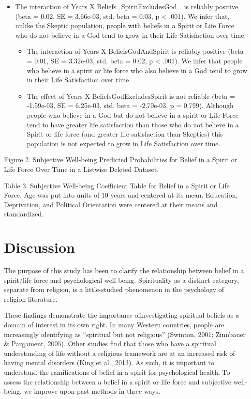 \documentclass[
  english,
  man]{apa6}
\providecommand{\tightlist}{%
  \setlength{\itemsep}{0pt}\setlength{\parskip}{0pt}}
\begin{document}
\begin{itemize}
\tightlist
\item
  The interaction of Years X Beliefs\_SpiritExcludesGod\_ is reliably positive (beta = 0.02, SE = 3.66e-03, std. beta = 0.03, p \textless{} .001). We infer that, unlike the Skeptic population, people with beliefs in a Spirit or Life Force who do not believe in a God tend to grow in their Life Satisfaction over time.

  \begin{itemize}
  \tightlist
  \item
    The interaction of Years X BeliefsGodAndSpirit is reliably positive (beta = 0.01, SE = 3.32e-03, std. beta = 0.02, p \textless{} .001). We infer that people who believe in a spirit or life force who also believe in a God tend to grow in their Life Satisfaction over time
  \item
    The effect of Years X BeliefsGodExcludesSpirit is not reliable (beta = -1.59e-03, SE = 6.25e-03, std. beta = -2.70e-03, p = 0.799). Although people who believe in a God but do not believe in a spirit or Life Force tend to have greater life satisfaction than those who do not believe in a Spirit or life force (and greater life satisfaction than Skeptics) this population is not expected to grow in Life Satisfaction over time.
  \end{itemize}
\end{itemize}

Figure 2. Subjective Well-being Predicted Probabilities for Belief in a Spirit or Life Force Over Time in a Listwise Deleted Dataset.

Table 3. Subjective Well-being Coefficient Table for Belief in a Spirit or Life Force. Age was put into units of 10 years and centered at its mean. Education, Deprivation, and Political Orientation were centered at their means and standardized.

\hypertarget{discussion}{%
\section{Discussion}\label{discussion}}

The purpose of this study has been to clarify the relationship between belief in a spirit/life force and psychological well-being. Spirituality as a distinct category, separate from religion, is a little-studied phenomenon in the psychology of religion literature.

These findings demonstrate the importance ofinvestigating spiritual beliefs as a domain of interest in its own right. In many Western countries, people are increasingly identifying as \enquote{spiritual but not religious} (Swinton, 2001; Zinnbauer \& Pargament, 2005). Other studies find that those who have a spiritual understanding of life without a religious framework are at an increased risk of having mental disorders (King et al., 2013). As such, it is important to understand the ramifications of belief in a spirit for psychological health.
To assess the relationship between a belief in a spirit or life force and subjective well-being, we improve upon past methods in three ways.
\end{document}
